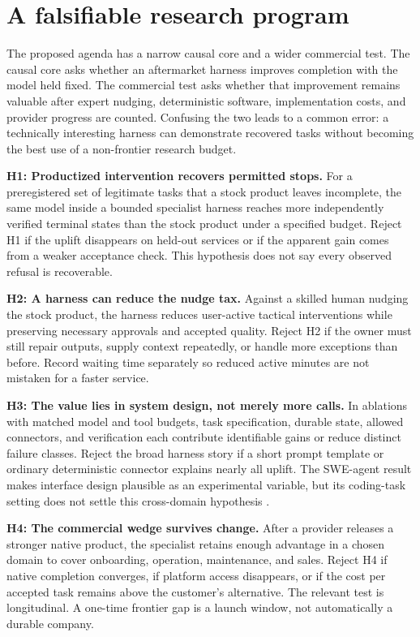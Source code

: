 \section{A falsifiable research program}

The proposed agenda has a narrow causal core and a wider commercial test. The causal core asks whether an aftermarket harness improves completion with the model held fixed. The commercial test asks whether that improvement remains valuable after expert nudging, deterministic software, implementation costs, and provider progress are counted. Confusing the two leads to a common error: a technically interesting harness can demonstrate recovered tasks without becoming the best use of a non-frontier research budget.

\textbf{H1: Productized intervention recovers permitted stops.} For a preregistered set of legitimate tasks that a stock product leaves incomplete, the same model inside a bounded specialist harness reaches more independently verified terminal states than the stock product under a specified budget. Reject H1 if the uplift disappears on held-out services or if the apparent gain comes from a weaker acceptance check. This hypothesis does not say every observed refusal is recoverable.

\textbf{H2: A harness can reduce the nudge tax.} Against a skilled human nudging the stock product, the harness reduces user-active tactical interventions while preserving necessary approvals and accepted quality. Reject H2 if the owner must still repair outputs, supply context repeatedly, or handle more exceptions than before. Record waiting time separately so reduced active minutes are not mistaken for a faster service.

\textbf{H3: The value lies in system design, not merely more calls.} In ablations with matched model and tool budgets, task specification, durable state, allowed connectors, and verification each contribute identifiable gains or reduce distinct failure classes. Reject the broad harness story if a short prompt template or ordinary deterministic connector explains nearly all uplift. The SWE-agent result makes interface design plausible as an experimental variable, but its coding-task setting does not settle this cross-domain hypothesis \citep{sweagent}.

\textbf{H4: The commercial wedge survives change.} After a provider releases a stronger native product, the specialist retains enough advantage in a chosen domain to cover onboarding, operation, maintenance, and sales. Reject H4 if native completion converges, if platform access disappears, or if the cost per accepted task remains above the customer's alternative. The relevant test is longitudinal. A one-time frontier gap is a launch window, not automatically a durable company.

